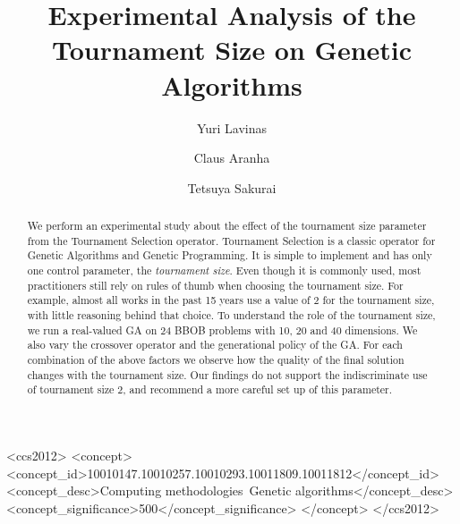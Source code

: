 \documentclass[sigconf, authordraft, anonymous]{acmart}
\begin{document}
\title{Experimental Analysis of the Tournament Size on Genetic Algorithms}

\author{Yuri Lavinas}

\author{Claus Aranha}

\author{Tetsuya Sakurai}

\begin{abstract}
We perform an experimental study about the effect of the tournament
size parameter from the Tournament Selection operator. Tournament
Selection is a classic operator for Genetic Algorithms and Genetic
Programming. It is simple to implement and has only one control
parameter, the \emph{tournament size}. Even though it is commonly
used, most practitioners still rely on rules of thumb when choosing
the tournament size. For example, almost all works in the past 15
years use a value of 2 for the tournament size, with little reasoning
behind that choice. To understand the role of the tournament size, we
run a real-valued GA on 24 BBOB problems with 10, 20 and 40
dimensions. We also vary the crossover operator and the generational
policy of the GA. For each combination of the above factors we observe
how the quality of the final solution changes with the tournament
size. Our findings do not support the indiscriminate use of tournament
size 2, and recommend a more careful set up of this parameter.
\end{abstract}

\begin{CCSXML}
<ccs2012>
<concept>
<concept_id>10010147.10010257.10010293.10011809.10011812</concept_id>
<concept_desc>Computing methodologies~Genetic algorithms</concept_desc>
<concept_significance>500</concept_significance>
</concept>
</ccs2012>
\end{CCSXML}




\maketitle

%

 







 
\end{document}
